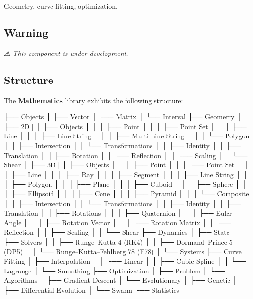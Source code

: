 Geometry, curve fitting, optimization.

\href{https://travis-ci.com/open-space-collective/open-space-toolkit-mathematics}{\tt } \href{https://codecov.io/gh/open-space-collective/open-space-toolkit-mathematics}{\tt } \href{https://open-space-collective.github.io/open-space-toolkit-mathematics}{\tt } \href{https://badge.fury.io/gh/open-space-collective%2Fopen-space-toolkit-mathematics}{\tt } \href{https://badge.fury.io/py/open-space-toolkit-mathematics}{\tt } \href{https://opensource.org/licenses/Apache-2.0}{\tt }

\subsection*{Warning}

{\itshape ⚠ This component is under development.}

\subsection*{Structure}

The {\bfseries Mathematics} library exhibits the following structure\+:


\begin{DoxyCode}
├── Objects
│   ├── Vector
│   ├── Matrix
│   └── Interval
├── Geometry
│   ├── 2D
|   │   ├── Objects
│   │   │   ├── Point
│   │   │   ├── Point Set
│   │   │   ├── Line
│   │   │   ├── Line String
│   │   │   ├── Multi Line String
│   │   │   └── Polygon
│   │   ├── Intersection
│   │   └── Transformations
│   │       ├── Identity
│   │       ├── Translation
│   │       ├── Rotation
│   │       ├── Reflection
│   │       ├── Scaling
│   │       └── Shear
│   ├── 3D
|   │   ├── Objects
│   │   │   ├── Point
│   │   │   ├── Point Set
│   │   │   ├── Line
│   │   │   ├── Ray
│   │   │   ├── Segment
│   │   │   ├── Line String
│   │   │   ├── Polygon
│   │   │   ├── Plane
│   │   │   ├── Cuboid
│   │   │   ├── Sphere
│   │   │   ├── Ellipsoid
│   │   │   ├── Cone
│   │   │   ├── Pyramid
│   │   │   └── Composite
│   │   ├── Intersection
│   │   └── Transformations
│   │       ├── Identity
│   │       ├── Translation
│   │       ├── Rotations
│   │       │   ├── Quaternion
│   │       │   ├── Euler Angle
│   │       │   ├── Rotation Vector
│   │       │   └── Rotation Matrix
│   │       ├── Reflection
│   │       ├── Scaling
│   │       └── Shear
├── Dynamics
│   ├── State
│   ├── Solvers
│   │   ├── Runge–Kutta 4 (RK4)
│   │   ├── Dormand–Prince 5 (DP5)
│   │   └── Runge–Kutta–Fehlberg 78 (F78)
│   └── Systems
├── Curve Fitting
│   ├── Interpolation
│   │   ├── Linear
│   │   ├── Cubic Spline
│   │   └── Lagrange
│   └── Smoothing
├── Optimization
│   ├── Problem
│   └── Algorithms
│       ├── Gradient Descent
│       └── Evolutionary
│           ├── Genetic
│           ├── Differential Evolution
│           └── Swarm
└── Statistics
\end{DoxyCode}


